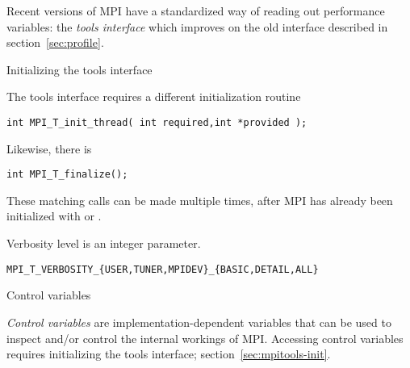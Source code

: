 

Recent versions of MPI have a standardized way of reading out
performance variables: the \emph{tools interface}
which improves on the old interface described in section~\ref{sec:profile}.

 {Initializing the tools interface}
\label{sec:mpitools-init}

The tools interface requires a different initialization routine
\begin{lstlisting}
int MPI_T_init_thread( int required,int *provided );
\end{lstlisting}
Likewise, there is 
\begin{lstlisting}
int MPI_T_finalize();
\end{lstlisting}
These matching calls can be made multiple times,
after MPI has already been initialized with
 or .

Verbosity level is an integer parameter.
\begin{verbatim}
MPI_T_VERBOSITY_{USER,TUNER,MPIDEV}_{BASIC,DETAIL,ALL}
\end{verbatim}

 {Control variables}
\label{sec:mpit-cvar}

\emph{Control variables} are implementation-dependent variables
that can be used to inspect and/or control the internal workings of MPI.
Accessing control variables requires initializing the tools interface;
section~\ref{sec:mpitools-init}.

